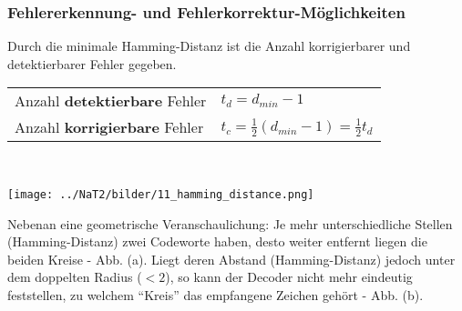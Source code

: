 \subsubsection{Fehlererkennung- und Fehlerkorrektur-Möglichkeiten}
Durch die minimale Hamming-Distanz ist die Anzahl korrigierbarer und detektierbarer Fehler
gegeben. \\
\renewcommand{\arraystretch}{1.4}
\begin{tabular}[c]{ p{5.5cm}  p{13cm} }
	Anzahl \textbf{detektierbare} Fehler & $t_d = d_{min} - 1$ \\
	Anzahl \textbf{korrigierbare} Fehler & $t_c = \frac12 (d_{min} - 1) = \frac12 t_d$
\end{tabular}
\renewcommand{\arraystretch}{1} \\

\begin{minipage}{8.5cm}
	\texttt{[image: ../NaT2/bilder/11\_hamming\_distance.png]}
\end{minipage}
\begin{minipage}{10.5cm}
	Nebenan eine geometrische Veranschaulichung: Je mehr unterschiedliche Stellen (Hamming-Distanz)
	zwei Codeworte haben, desto weiter entfernt liegen die beiden Kreise - Abb. (a). Liegt deren
	Abstand (Hamming-Distanz) jedoch unter dem doppelten Radius ($< 2$), so kann der Decoder nicht mehr
	eindeutig feststellen, zu welchem ``Kreis'' das empfangene Zeichen gehört - Abb. (b).
\end{minipage} 

